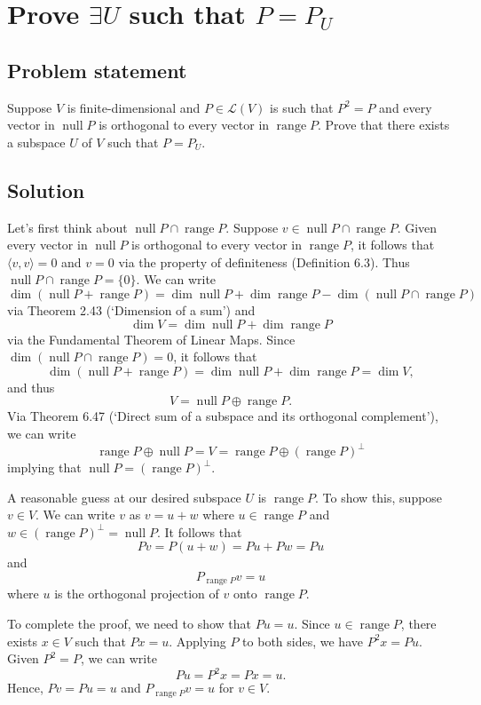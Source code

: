 \documentclass{article}
\begin{document}
\clearpage

\section{Prove $\exists U$ such that $P=P_U$}
\subsection*{Problem statement}
Suppose $V$ is finite-dimensional and $P\in\mathcal{L}(V)$ is such that $P^2=P$ and every vector in $\operatorname{null}P$ is orthogonal to every vector in $\operatorname{range}P$. 
Prove that there exists a subspace $U$ of $V$ such that $P=P_U$. 

\subsection*{Solution}
Let's first think about $\operatorname{null}P\cap\operatorname{range}P$. 
Suppose $v\in \operatorname{null}P\cap\operatorname{range}P$. 
Given every vector in $\operatorname{null}P$ is orthogonal to every vector in $\operatorname{range}P$, it follows that $\langle v,v\rangle=0$ and $v=0$ via the property of definiteness (Definition 6.3). 
Thus $\operatorname{null}P\cap\operatorname{range}P=\{0\}$. 
We can write
\[\dim(\operatorname{null}P+\operatorname{range}P)=\dim\operatorname{null}P+\dim\operatorname{range}P-\dim(\operatorname{null}P\cap\operatorname{range}P)\]
via Theorem 2.43 (`Dimension of a sum') and 
\[\dim V=\dim\operatorname{null}P+\dim\operatorname{range}P\]
via the Fundamental Theorem of Linear Maps. 
Since $\dim(\operatorname{null}P\cap\operatorname{range}P)=0$, it follows that 
\[\dim(\operatorname{null}P+\operatorname{range}P)=\dim\operatorname{null}P+\dim\operatorname{range}P=\dim V,\]
and thus
\[V=\operatorname{null}P\oplus\operatorname{range}P.\]
Via Theorem 6.47 (`Direct sum of a subspace and its orthogonal complement'), we can write
\[\operatorname{range}P\oplus\operatorname{null}P=V=\operatorname{range}P\oplus(\operatorname{range}P)^\bot\]
implying that $\operatorname{null}P=(\operatorname{range}P)^\bot$.

A reasonable guess at our desired subspace $U$ is $\operatorname{range}P$. 
To show this, suppose $v\in V$. 
We can write $v$ as $v=u+w$ where $u\in \operatorname{range}P$ and \newline$w\in(\operatorname{range}P)^\bot=\operatorname{null}P$. 
It follows that
\[Pv=P(u+w)=Pu+Pw=Pu\]
and
\[P_{\operatorname{range}P}v=u\]
where $u$ is the orthogonal projection of $v$ onto $\operatorname{range}P$. 

To complete the proof, we need to show that $Pu=u$. 
Since $u\in\operatorname{range}P$, there exists $x\in V$ such that $Px=u$. 
Applying $P$ to both sides, we have $P^2x=Pu$. 
Given $P^2=P$, we can write
\[Pu=P^2x=Px=u.\]
Hence, $Pv=Pu=u$ and $P_{\operatorname{range}P}v=u$ for $v\in V$.
\end{document}
